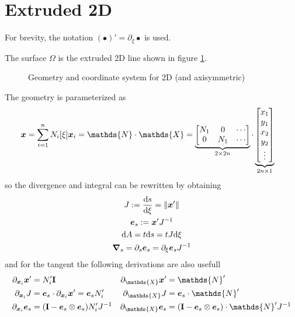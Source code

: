 \documentclass[a4paper,11pt]{article}
\renewcommand{\to}[1]{\text{\boldmath $#1$}} %
\newcommand{\ts}[1]{\text{\boldmath $\mathrm{#1}$}} %
\newcommand{\uv}[1]{\mathds{#1}}
\newcommand{\um}[1]{\mathds{#1}}
\newcommand{\intd}[1]{\mathrm{d}#1}
\newcommand{\pderiv}[2]{\partial_{#2} #1}
\newcommand{\dderiv}[2]{\frac{\mathrm{d}#1}{\mathrm{d}#2}}
\newcommand{\norm}[1]{\left\lVert{#1}\right\rVert}
\newcommand{\defeq}{:=}
\begin{document}
\section{Extruded 2D}
For brevity, the notation $(\bullet)' = \pderiv{\bullet}{\xi}$ is used.

The surface $\Omega$ is the extruded 2D line shown in figure \ref{fig:extruded}.
\begin{figure}[htpb]
 \centering
 \caption{Geometry and coordinate system for 2D (and axisymmetric)}
 \label{fig:extruded}
\end{figure}

The geometry is parameterized as
\begin{align}
 \to x &= \sum_{i=1}^n N_i[\xi]\to x_i
  = \um N \cdot \uv X
  = \underbrace{\begin{bmatrix}N_1 & 0 & \cdots\\ 0 & N_1 & \cdots \end{bmatrix}}_{2\times 2n}\cdot \underbrace{\begin{bmatrix}x_1\\y_1\\x_2\\y_2\\ \vdots\end{bmatrix}}_{2n\times 1}
\end{align}
so the divergence and integral can be rewritten by obtaining
\begin{gather}
 J \defeq \dderiv{s}{\xi} = \norm{\to x'}\\
 \to e_s \defeq \to x' J^{-1}\\
 \intd A = t \intd s = t J \intd \xi     \label{eq:intdA_2d}\\
 \to \nabla_s = \pderiv{}{s}\to e_s = \pderiv{}{\xi}\to e_s J^{-1}    \label{eq:nabla_s_2d}
\end{gather}
and for the tangent the following derivations are also usefull
\begin{align}
 \pderiv{\to x'}{\to x_i} &= N_i' \ts I & \pderiv{\to x'}{\uv X} &= \um N'\\
 \pderiv{J}{\to x_i} &= \to e_s \cdot \pderiv{\to x'}{\to x_i} = \to e_s N_i'  & \pderiv{J}{\uv X} &= \to e_s\cdot \um N' \\
 \pderiv{\to e_s}{\to x_i} &= (\ts I - \to e_s\otimes\to e_s)N_i' J^{-1} &  \pderiv{\to e_s}{\uv X} &= (\ts I - \to e_s\otimes \to e_s)\cdot \um N' J^{-1}
\end{align}
\end{document}
